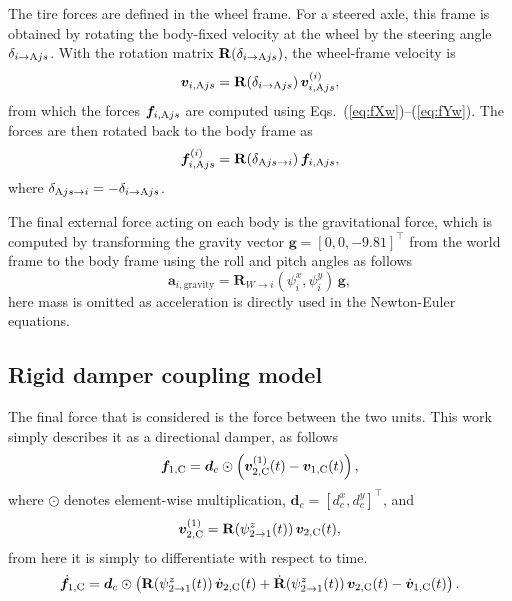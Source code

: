 \documentclass[conference]{IEEEtran}
\begin{document}
The tire forces are defined in the wheel frame. For a steered axle, this frame is obtained by rotating the body-fixed velocity at the wheel by the steering angle $\delta_{i\to \text{A} j s}$. With the rotation matrix $\mathbf{R}(\delta_{i\to\text{A} j s})$, the wheel-frame velocity is
\begin{equation}
    \bm v_{i,\text{A} j s} = \mathbf{R}(\delta_{i\to\text{A} j s})\,\bm v_{i,\text{A} j s}^{(i)},
\end{equation}
from which the forces $\bm f_{i,\text{A} j s}$ are computed using Eqs.~(\ref{eq:fXw})--(\ref{eq:fYw}). The forces are then rotated back to the body frame as
\begin{equation}
    \bm f_{i,\text{A} j s}^{(i)} = \mathbf{R}(\delta_{\text{A} j s\to i})\,\bm f_{i,\text{A} j s},
\end{equation}
where $\delta_{\text{A} j s\to i} = -\delta_{i\to\text{A} j s}$.

The final external force acting on each body is the gravitational force, which is computed by transforming the gravity vector $\bm g = [0,0,-9.81]^\top$ from the world frame to the body frame using the roll and pitch angles as follows
\begin{equation}
    \bm a_{i,\text{gravity}} = \mathbf{R}_{W\to i}(\psi^x_i, \psi^y_i)\,\bm g,
\end{equation}
here mass is omitted as acceleration is directly used in the Newton-Euler equations.

\subsection{Rigid damper coupling model}
The final force that is considered is the force between the two units. This work simply describes it as a directional damper, as follows
\begin{equation}
    \bm{f}_{1,\text{C}} = \bm{d}_c \odot \left(\bm{v}_{2,\text{C}}^{(1)}(t) - \bm{v}_{1,\text{C}}(t)\right),
\end{equation}
where $\odot$ denotes element-wise multiplication, $\bm{d}_c = [d_c^x, d_c^y]^\top$, and
\begin{equation}
    \bm{v}_{2,\text{C}}^{(1)} = \mathbf{R}(\psi^z_{2\to1}(t))\,\bm v_{2,\text{C}}(t),
\end{equation}
from here it is simply to differentiate with respect to time.
\begin{equation}
    \dot{\bm{f}}_{1,\text{C}} = \bm{d}_c \odot \left( \mathbf{R}(\psi^z_{2\to1}(t))\,\dot{\bm v}_{2,\text{C}}(t) + \dot{\mathbf{R}}(\psi^z_{2\to1}(t))\,\bm v_{2,\text{C}}(t) - \dot{\bm v}_{1,\text{C}}(t) \right). \label{eq:Damper}
\end{equation}
\end{document}
